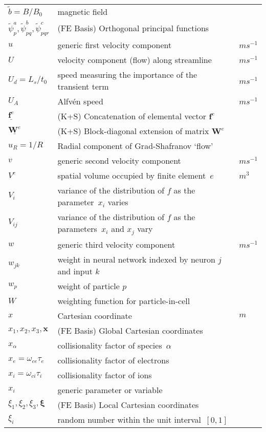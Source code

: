 \begin{longtable}{|p{3.0cm}|p{10.0cm}|p{3.0cm}|}
$\tilde{b}=B/B_0$ & magnetic field & \\
$\tilde{\psi}^a_p, \tilde{\psi}^b_{pq}, \tilde{\psi}^c_{pqr}$ &  (FE Basis) Orthogonal principal functions & \\
$u$ & generic first velocity component  & $m s^{-1}$ \\
$U$ & velocity component (flow) along streamline  & $m s^{-1}$ \\
$U_d =L_s/t_0$ & speed measuring the importance of the transient term  & $m s^{-1}$ \\
$U_A$  & Alfv\'{e}n speed  & $m s^{-1}$ \\
$\underline{\boldsymbol{f}^e}$ &  (K+S) Concatenation of elemental vector $\boldsymbol{f}^e$ & \\
$\underline{\boldsymbol{W}^e}$ &  (K+S) Block-diagonal extension of matrix $\boldsymbol{W}^e$ & \\
$u_R=1/R$ & Radial component of Grad-Shafranov `flow' & \\
$v$ & generic second velocity component  & $m s^{-1}$ \\
$V^e$ & spatial volume occupied by finite element~$e$  & $m^3$ \\
$V_i$ & variance of the distribution of $f$ as the parameter~$x_i$ varies  & \\
$V_{ij}$ & variance of the distribution of $f$ as the parameters~$x_i$ and $x_j$ vary  & \\
$w$ & generic third velocity component  & $m s^{-1}$ \\
$w_{jk}$ & weight in neural network indexed by neuron $j$ and input $k$  & \\
$w_p$ & weight of particle $p$ & \\
$W$ & weighting function for particle-in-cell & \\
$x$ & Cartesian coordinate  & $m$ \\
$x_1, x_2, x_3, {\mathbf x}$ &  (FE Basis) Global Cartesian coordinates & \\
$x_\alpha$ & collisionality factor of species~$\alpha$ & \\
$x_e = \omega_{ce}\tau_e$ & collisionality factor of electrons & \\
$x_i = \omega_{ci}\tau_i$ & collisionality factor of ions & \\
$x_i$ & generic parameter or variable  & \\ 
$\xi_1, \xi_2, \xi_3, \boldsymbol{\xi}$ &  (FE Basis) Local Cartesian coordinates & \\
$\xi_i$ & random number within the unit interval~$[0,1]$  & \\

\end{longtable}
